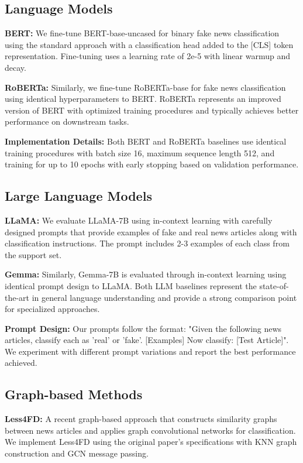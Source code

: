 \subsection{Language Models}

\textbf{BERT:} We fine-tune BERT-base-uncased for binary fake news classification using the standard approach with a classification head added to the [CLS] token representation. Fine-tuning uses a learning rate of 2e-5 with linear warmup and decay.

\textbf{RoBERTa:} Similarly, we fine-tune RoBERTa-base for fake news classification using identical hyperparameters to BERT. RoBERTa represents an improved version of BERT with optimized training procedures and typically achieves better performance on downstream tasks.

\textbf{Implementation Details:} Both BERT and RoBERTa baselines use identical training procedures with batch size 16, maximum sequence length 512, and training for up to 10 epochs with early stopping based on validation performance.

\subsection{Large Language Models}

\textbf{LLaMA:} We evaluate LLaMA-7B using in-context learning with carefully designed prompts that provide examples of fake and real news articles along with classification instructions. The prompt includes 2-3 examples of each class from the support set.

\textbf{Gemma:} Similarly, Gemma-7B is evaluated through in-context learning using identical prompt design to LLaMA. Both LLM baselines represent the state-of-the-art in general language understanding and provide a strong comparison point for specialized approaches.

\textbf{Prompt Design:} Our prompts follow the format: "Given the following news articles, classify each as 'real' or 'fake'. [Examples] Now classify: [Test Article]". We experiment with different prompt variations and report the best performance achieved.

\subsection{Graph-based Methods}

\textbf{Less4FD:} A recent graph-based approach that constructs similarity graphs between news articles and applies graph convolutional networks for classification. We implement Less4FD using the original paper's specifications with KNN graph construction and GCN message passing.

